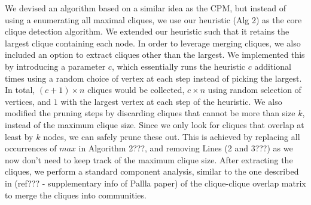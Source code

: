 We devised an algorithm based on a similar idea as the CPM, but instead of using a enumerating all maximal cliques, we use our heuristic (Alg 2) as the core clique detection algorithm. We extended our heuristic such that it retains the largest clique containing each node. In order to leverage merging cliques, we also included an option to extract cliques other than the largest. We implemented this by introducing a parameter $c$, which essentially runs the heuristic $c$ additional times using a random choice of vertex at each step instead of picking the largest. In total, $(c+1) \times n$ cliques would be collected, $c \times n$ using random selection of vertices, and $1$ with the largest vertex at each step of the heuristic. We also modified the pruning steps by discarding cliques that cannot be more than size $k$, instead of the maximum clique size. Since we only look for cliques that overlap at least by $k$ nodes, we can safely prune these out. This is achieved by replacing all occurrences of $max$ in Algorithm 2???, and removing Lines (2 and 3???) as we now don't need to keep track of the maximum clique size. After extracting the cliques, we perform a standard component analysis, similar to the one described in (ref??? - supplementary info of Pallla paper) of the clique-clique overlap matrix to merge the cliques into communities.


